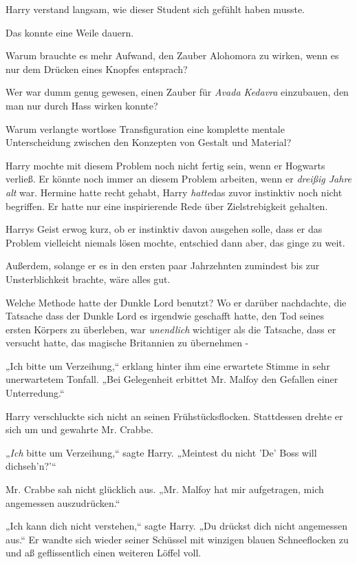 {Harry verstand langsam, wie dieser Student sich gefühlt haben musste.

Das konnte eine Weile dauern.

Warum brauchte es mehr Aufwand, den Zauber Alohomora zu wirken, wenn es nur dem Drücken eines Knopfes entsprach?

Wer war dumm genug gewesen, einen Zauber für \emph{Avada Kedavra} einzubauen, den man nur durch Hass wirken konnte?

Warum verlangte wortlose Transfiguration eine komplette mentale Unterscheidung zwischen den Konzepten von Gestalt und Material?

Harry mochte mit diesem Problem noch nicht fertig sein, wenn er Hogwarts verließ. Er könnte noch immer an diesem Problem arbeiten, wenn er \emph{dreißig Jahre alt} war. Hermine hatte recht gehabt, Harry \emph{hatte}das zuvor instinktiv noch nicht begriffen. Er hatte nur eine inspirierende Rede über Zielstrebigkeit gehalten.

Harrys Geist erwog kurz, ob er instinktiv davon ausgehen solle, dass er das Problem vielleicht niemals lösen mochte, entschied dann aber, das ginge zu weit.

Außerdem, solange er es in den ersten paar Jahrzehnten zumindest bis zur Unsterblichkeit brachte, wäre alles gut.

Welche Methode hatte der Dunkle Lord benutzt? Wo er darüber nachdachte, die Tatsache dass der Dunkle Lord es irgendwie geschafft hatte, den Tod seines ersten Körpers zu überleben, war \emph{unendlich} wichtiger als die Tatsache, dass er versucht hatte, das magische Britannien zu übernehmen -

„Ich bitte um Verzeihung,“ erklang hinter ihm eine erwartete Stimme in sehr unerwartetem Tonfall. „Bei Gelegenheit erbittet Mr. Malfoy den Gefallen einer Unterredung.“

Harry verschluckte sich nicht an seinen Frühstücksflocken. Stattdessen drehte er sich um und gewahrte Mr. Crabbe.

„\emph{Ich} bitte um Verzeihung,“ sagte Harry. „Meintest du nicht 'De' Boss will dichseh'n?'“

Mr. Crabbe sah nicht glücklich aus. „Mr. Malfoy hat mir aufgetragen, mich angemessen auszudrücken.“

„Ich kann dich nicht verstehen,“ sagte Harry. „Du drückst dich nicht angemessen aus.“ Er wandte sich wieder seiner Schüssel mit winzigen blauen Schneeflocken zu und aß geflissentlich einen weiteren Löffel voll.

}
